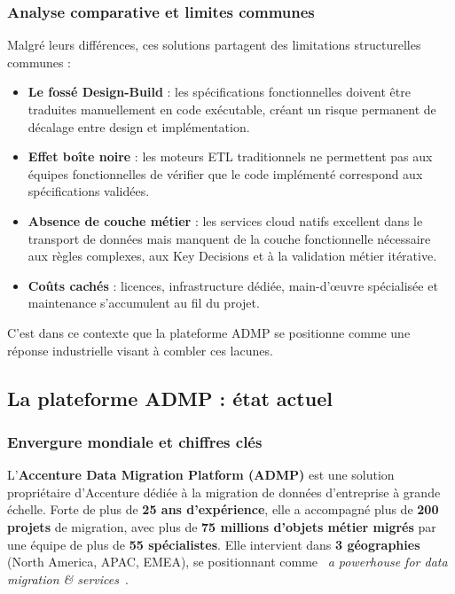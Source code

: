 \subsubsection{Analyse comparative et limites communes}
\label{subsubsec:limites-communes}

Malgré leurs différences, ces solutions partagent des limitations structurelles
communes :

\begin{itemize}[leftmargin=*]
    \item \textbf{Le fossé Design-Build} : les spécifications fonctionnelles
    doivent être traduites manuellement en code exécutable, créant un risque
    permanent de décalage entre design et implémentation.
    \item \textbf{Effet boîte noire} : les moteurs ETL traditionnels ne
    permettent pas aux équipes fonctionnelles de vérifier que le code implémenté
    correspond aux spécifications validées.
    \item \textbf{Absence de couche métier} : les services cloud natifs excellent
    dans le transport de données mais manquent de la couche fonctionnelle
    nécessaire aux règles complexes, aux Key Decisions et à la validation métier
    itérative.
    \item \textbf{Coûts cachés} : licences, infrastructure dédiée, main-d'œuvre
    spécialisée et maintenance s'accumulent au fil du projet.
\end{itemize}

C'est dans ce contexte que la plateforme ADMP se positionne comme une réponse
industrielle visant à combler ces lacunes.


\subsection{La plateforme ADMP : état actuel}
\label{subsec:admp-actuel}

\subsubsection{Envergure mondiale et chiffres clés}
\label{subsubsec:admp-envergure}

L'\textbf{Accenture Data Migration Platform (ADMP)} est une solution
propriétaire d'Accenture dédiée à la migration de données d'entreprise à grande
échelle. Forte de plus de \textbf{25 ans d'expérience}, elle a accompagné plus
de \textbf{200 projets} de migration, avec plus de \textbf{75 millions d'objets
métier migrés} par une équipe de plus de \textbf{55 spécialistes}. Elle
intervient dans \textbf{3 géographies} (North America, APAC, EMEA), se
positionnant comme \og~\textit{a powerhouse for data migration \&
services}~\fg{}.

